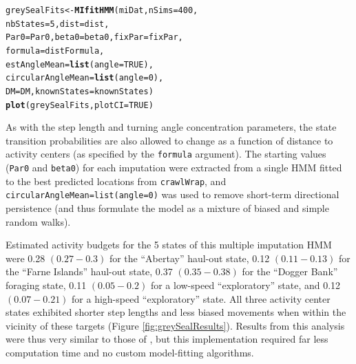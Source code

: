 \documentclass[12pt]{article}\usepackage[]{graphicx}\usepackage[]{xcolor}
\makeatletter
\newcommand{\hlnum}[1]{\textcolor[rgb]{0.686,0.059,0.569}{#1}}%
\newcommand{\hldef}[1]{\textcolor[rgb]{0.345,0.345,0.345}{#1}}%
\newcommand{\hlkwb}[1]{\textcolor[rgb]{0.69,0.353,0.396}{#1}}%
\newcommand{\hlkwc}[1]{\textcolor[rgb]{0.333,0.667,0.333}{#1}}%
\newcommand{\hlkwd}[1]{\textcolor[rgb]{0.737,0.353,0.396}{\textbf{#1}}}%
\newenvironment{kframe}{%
 \def\at@end@of@kframe{}%
 \ifinner\ifhmode%
  \def\at@end@of@kframe{\end{minipage}}%
  \begin{minipage}{\columnwidth}%
 \fi\fi%
 \def\FrameCommand##1{\hskip\@totalleftmargin \hskip-\fboxsep
 \colorbox{shadecolor}{##1}\hskip-\fboxsep
     \hskip-\linewidth \hskip-\@totalleftmargin \hskip\columnwidth}%
 \MakeFramed {\advance\hsize-\width
   \@totalleftmargin\z@ \linewidth\hsize
   \@setminipage}}%
 {\par\unskip\endMakeFramed%
 \at@end@of@kframe}
\newenvironment{knitrout}{}{} %
\makeatother
\begin{document}
\begin{knitrout}
\color{fgcolor}\begin{kframe}
\begin{alltt}
\hldef{greySealFits} \hlkwb{<-} \hlkwd{MIfitHMM}\hldef{(miDat,} \hlkwc{nSims} \hldef{=} \hlnum{400}\hldef{,}
                         \hlkwc{nbStates} \hldef{=} \hlnum{5}\hldef{,} \hlkwc{dist} \hldef{= dist,}
                         \hlkwc{Par0} \hldef{= Par0,} \hlkwc{beta0} \hldef{= beta0,} \hlkwc{fixPar} \hldef{= fixPar,}
                         \hlkwc{formula} \hldef{= distFormula,}
                         \hlkwc{estAngleMean} \hldef{=} \hlkwd{list}\hldef{(}\hlkwc{angle}\hldef{=}\hlnum{TRUE}\hldef{),}
                         \hlkwc{circularAngleMean} \hldef{=} \hlkwd{list}\hldef{(}\hlkwc{angle}\hldef{=}\hlnum{0}\hldef{),}
                         \hlkwc{DM} \hldef{= DM,} \hlkwc{knownStates} \hldef{= knownStates)}
\hlkwd{plot}\hldef{(greySealFits,} \hlkwc{plotCI} \hldef{=} \hlnum{TRUE}\hldef{)}
\end{alltt}
\end{kframe}
\end{knitrout}
As with the step length and turning angle concentration parameters, the state transition probabilities are also allowed to change as a function of distance to activity centers (as specified by the \verb|formula| argument). The starting values (\verb|Par0| and \verb|beta0|) for each imputation were extracted from a single HMM fitted to the best predicted locations from \verb|crawlWrap|, and \verb|circularAngleMean=list(angle=0)| was used to remove short-term directional persistence (and thus formulate the model as a mixture of biased and simple random walks). %

Estimated activity budgets for the 5 states of this multiple imputation HMM were 0.28 $(0.27-0.3)$ for the ``Abertay'' haul-out state, 0.12 $(0.11-0.13)$ for the ``Farne Islands'' haul-out state, 0.37 $(0.35-0.38)$ for the ``Dogger Bank'' foraging state, 0.11 $(0.05-0.2)$ for a low-speed ``exploratory'' state, and 0.12 $(0.07-0.21)$ for a high-speed ``exploratory'' state. All three activity center states exhibited shorter step lengths and less biased movements when within the vicinity of these targets (Figure \ref{fig:greySealResults}). Results from this analysis were thus very similar to those of \cite{McClintockEtAl2012}, but this implementation required far less computation time and no custom model-fitting algorithms. 
\end{document}
